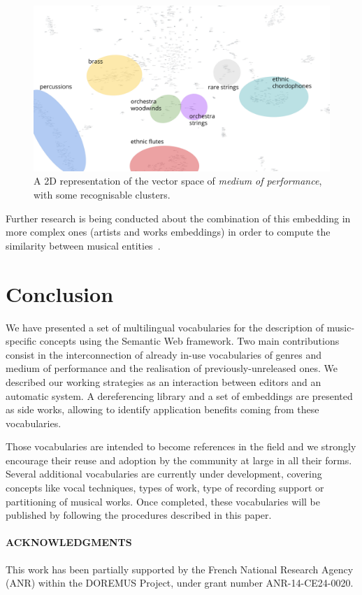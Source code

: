 \documentclass{article}
\begin{document}
\begin{figure}
	\centering
		\includegraphics[width=\columnwidth]{figs/map-mop.jpg}
	\caption{A 2D representation of the vector space of \textit{medium of performance}, with some recognisable clusters.}
	\label{fig:mop-space}
\end{figure}

Further research is being conducted about the combination of this embedding in more complex ones (artists and works embeddings) in order to compute the similarity between musical entities~\cite{lisena2017artistsimilarity}.

\section{Conclusion}\label{sec:conclusion}
We have presented a set of multilingual vocabularies for the description of music-specific concepts using the Semantic Web framework. Two main contributions consist in the interconnection of already in-use vocabularies of genres and medium of performance and the realisation of previously-unreleased ones. We described our working strategies as an interaction between editors and an automatic system. A dereferencing library and a set of embeddings are presented as side works, allowing to identify application benefits coming from these vocabularies. 

Those vocabularies are intended to become references in the field and we strongly encourage their reuse and adoption by the community at large in all their forms. Several additional vocabularies are currently under development, covering concepts like vocal techniques, types of work, type of recording support or partitioning of musical works. Once completed, these vocabularies will be published by following the procedures described in this paper.

\paragraph*{ACKNOWLEDGMENTS} This work has been partially supported by the French National Research Agency (ANR) within the DOREMUS Project, under grant number ANR-14-CE24-0020.


\end{document}
